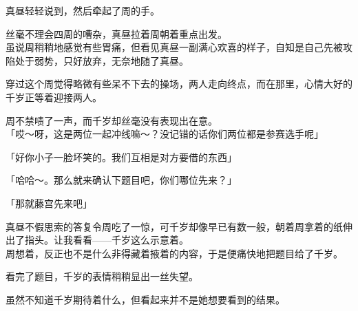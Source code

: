 真昼轻轻说到，然后牵起了周的手。

丝毫不理会四周的嘈杂，真昼拉着周朝着重点出发。\\

虽说周稍稍地感觉有些胃痛，但看见真昼一副满心欢喜的样子，自知是自己先被攻陷处于弱势，只好放弃，无奈地随了真昼。

穿过这个周觉得略微有些呆不下去的操场，两人走向终点，而在那里，心情大好的千岁正等着迎接两人。

周不禁啧了一声，而千岁却丝毫没有表现出在意。\\

「哎～呀，这是两位一起冲线嘛～？没记错的话你们两位都是参赛选手呢」

「好你小子一脸坏笑的。我们互相是对方要借的东西」

「哈哈～。那么就来确认下题目吧，你们哪位先来？」

「那就藤宫先来吧」

真昼不假思索的答复令周吃了一惊，可千岁却像早已有数一般，朝着周拿着的纸伸出了指头。让我看看——千岁这么示意着。\\

周想着，反正也不是什么非得藏着掖着的内容，于是便痛快地把题目给了千岁。

看完了题目，千岁的表情稍稍显出一丝失望。

虽然不知道千岁期待着什么，但看起来并不是她想要看到的结果。\\

